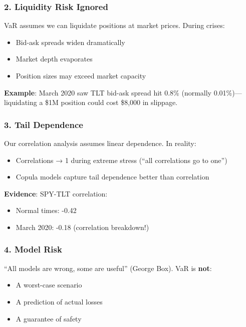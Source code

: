 \documentclass[12pt,a4paper]{article}
\begin{document}
\subsubsection{2. Liquidity Risk Ignored}

VaR assumes we can liquidate positions at market prices. During crises:
\begin{itemize}
    \item Bid-ask spreads widen dramatically
    \item Market depth evaporates
    \item Position sizes may exceed market capacity
\end{itemize}

\textbf{Example}: March 2020 saw TLT bid-ask spread hit 0.8\% (normally 0.01\%)—liquidating a \$1M position could cost \$8,000 in slippage.

\subsubsection{3. Tail Dependence}

Our correlation analysis assumes linear dependence. In reality:
\begin{itemize}
    \item Correlations → 1 during extreme stress (``all correlations go to one'')
    \item Copula models capture tail dependence better than correlation
\end{itemize}

\textbf{Evidence}: SPY-TLT correlation:
\begin{itemize}
    \item Normal times: -0.42
    \item March 2020: -0.18 (correlation breakdown!)
\end{itemize}

\subsubsection{4. Model Risk}

``All models are wrong, some are useful'' (George Box). VaR is \textbf{not}:
\begin{itemize}
    \item A worst-case scenario
    \item A prediction of actual losses
    \item A guarantee of safety
\end{itemize}
\end{document}
